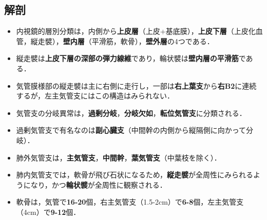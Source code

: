 \subsection{解剖}
\begin{itemize}

\item 内視鏡的層別分類は，内側から\textbf{上皮層}（上皮+基底膜），\textbf{上皮下層}（上皮化血管，縦走襞），\textbf{壁内層}（平滑筋，軟骨），\textbf{壁外層}の4つである．

\item 縦走襞は\textbf{上皮下層の深部の弾力線維}であり，輪状襞は\textbf{壁内層の平滑筋}である．
\item 気管膜様部の縦走襞は主に右側に走行し，一部は\textbf{右上葉支}から\textbf{右B2}に連続するが，左主気管支にはこの構造はみられない．
\item 気管支の分岐異常は，\textbf{過剰分岐}，\textbf{分岐欠如}，\textbf{転位気管支}に分類される．
\item 過剰気管支で有名なのは\textbf{副心臓支}（中間幹の内側から縦隔側に向かって分岐）．
\item 肺外気管支は，\textbf{主気管支}，\textbf{中間幹}，\textbf{葉気管支}（中葉枝を除く）．

\item 肺内気管支では，軟骨が飛び石状になるため，\textbf{縦走襞}が全周性にみられるようになり，かつ\textbf{輪状襞}が全周性に観察される．
\item 軟骨は，気管で\textbf{16-20}個，右主気管支（1.5-2cm）で\textbf{6-8}個，左主気管支（4cm）で\textbf{9-12}個．


\end{itemize}

